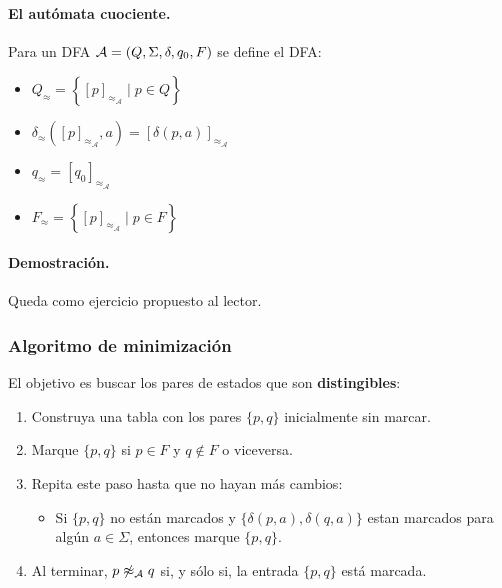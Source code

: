 \paragraph{El autómata cuociente.} Para un DFA $\mathcal{A} = (Q,\Sigma,\delta,q_0,F)$ se define el DFA:
\begin{itemize}
    \item $Q_{\approx}=\left\{[p]_{\approx_\mathcal{A}} \mid p \in Q\right\}$
    \item $\delta_{\approx}\left([p]_{\approx_\mathcal{A}}, a\right)=[\delta(p, a)]_{\approx_\mathcal{A}}$
    \item $q_{\approx}=\left[q_0\right]_{\approx_\mathcal{A}}$
    \item $F_{\approx}=\left\{[p]_{\approx_\mathcal{A}} \mid p \in F\right\}$
\end{itemize}


\paragraph{Demostración.} Queda como ejercicio propuesto al lector.

\subsubsection{Algoritmo de minimización}

El objetivo es buscar los pares de estados que son \textbf{distingibles}:
\begin{enumerate}
    \item Construya una tabla con los pares $\{p,q\}$ inicialmente sin marcar.
    \item Marque $\{p,q\}$ si $p \in F$ y $q \notin F$ o viceversa.
    \item Repita este paso hasta que no hayan más cambios:
          \begin{itemize}
              \item Si $\{p,q\}$ no están marcados y $\{\delta(p,a),\delta(q,a)\}$ estan marcados para algún $a \in \Sigma$, entonces marque $\{p,q\}$.
          \end{itemize}
    \item Al terminar, $p \not\approx_{\mathcal{A}} q$ si, y sólo si, la entrada $\{p,q\}$ está marcada.
\end{enumerate}

